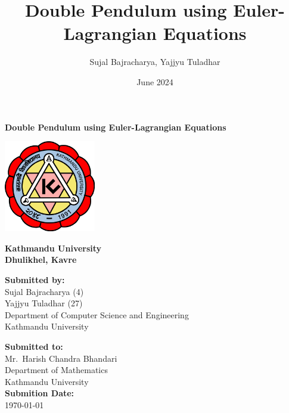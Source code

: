 \documentclass{article}
\begin{document}
\title{Double Pendulum using Euler-Lagrangian Equations}
\author{Sujal Bajracharya, Yajjyu Tuladhar}
\date{June 2024}

\begin{titlepage}
    \centering
    \vspace*{1.5cm}

    {\huge\bfseries Double Pendulum using Euler-Lagrangian Equations\par}
     \vspace{2.5cm}
     \includegraphics[width=0.3\textwidth]{KU-Logo.png}\par
    \vspace{0.5cm}
    {\Large \textbf{Kathmandu University \\ Dhulikhel, Kavre}}\\
    \vspace{2.5cm}
    \begin{center}
        
        \vspace{1cm}
        
        {\large \textbf{Submitted by:}} \\
        Sujal Bajracharya (4) \\
        Yajjyu Tuladhar (27) \\
        Department of Computer Science and Engineering \\
        Kathmandu University
    
        \vspace{1.5cm}
        {\large \textbf{Submitted to:}}\\
        Mr.\ Harish Chandra Bhandari \\
        Department of Mathematics \\
        Kathmandu University \\

        \vspace{1.5cm}
        {\large \textbf{Submition Date: }}\\
        \today
    \end{center}

    

    
    \vspace{1cm}
\end{titlepage}
\end{document}
